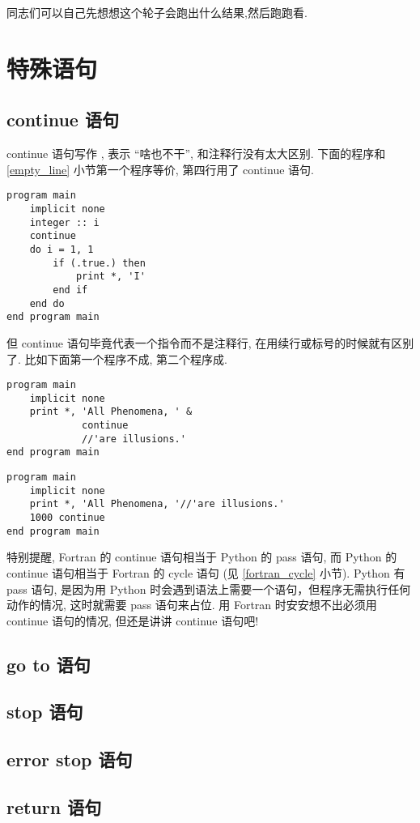 同志们可以自己先想想这个轮子会跑出什么结果,然后跑跑看.

\section{特殊语句}

\subsection{continue 语句}

continue 语句写作 , 表示 ``啥也不干'', 和注释行没有太大区别. 下面的程序和 \ref{empty_line} 小节第一个程序等价, 第四行用了 continue 语句.
\begin{lstlisting}
program main
    implicit none
    integer :: i
    continue
    do i = 1, 1
        if (.true.) then
            print *, 'I'
        end if
    end do
end program main
\end{lstlisting}
但 continue 语句毕竟代表一个指令而不是注释行, 在用续行或标号的时候就有区别了. 比如下面第一个程序不成, 第二个程序成.
\begin{lstlisting}
program main
    implicit none
    print *, 'All Phenomena, ' &
             continue
             //'are illusions.'
end program main
\end{lstlisting}
\begin{lstlisting}
program main
    implicit none
    print *, 'All Phenomena, '//'are illusions.'
    1000 continue
end program main
\end{lstlisting}

特别提醒, Fortran 的 continue 语句相当于 Python 的 pass 语句, 而 Python 的 continue 语句相当于 Fortran 的 cycle 语句 (见 \ref{fortran_cycle} 小节). Python 有 pass 语句, 是因为用 Python 时会遇到语法上需要一个语句，但程序无需执行任何动作的情况, 这时就需要 pass 语句来占位. 用 Fortran 时安安想不出必须用 continue 语句的情况, 但还是讲讲 continue 语句吧!

\subsection{go to 语句}

\subsection{stop 语句}

\subsection{error stop 语句}

\subsection{return 语句}

